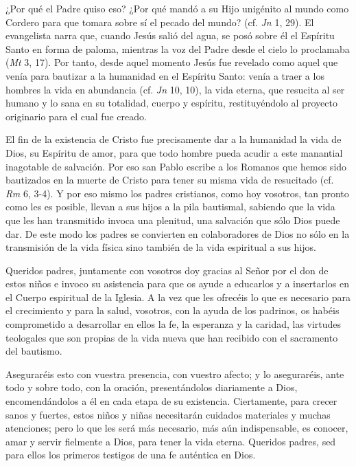 {¿Por qué el Padre quiso eso? ¿Por qué mandó a su Hijo unigénito al mundo como Cordero para que tomara sobre sí el pecado del mundo? (cf. \emph{Jn} 1, 29). El evangelista narra que, cuando Jesús salió del agua, se posó sobre él el Espíritu Santo en forma de paloma, mientras la voz del Padre desde el cielo lo proclamaba  (\emph{Mt} 3, 17). Por tanto, desde aquel momento Jesús fue revelado como aquel que venía para bautizar a la humanidad en el Espíritu Santo: venía a traer a los hombres la vida en abundancia (cf. \emph{Jn} 10, 10), la vida eterna, que resucita al ser humano y lo sana en su totalidad, cuerpo y espíritu, restituyéndolo al proyecto originario para el cual fue creado.

El fin de la existencia de Cristo fue precisamente dar a la humanidad la vida de Dios, su Espíritu de amor, para que todo hombre pueda acudir a este manantial inagotable de salvación. Por eso san Pablo escribe a los Romanos que hemos sido bautizados en la muerte de Cristo para tener su misma vida de resucitado (cf. \emph{Rm} 6, 3-4). Y por eso mismo los padres cristianos, como hoy vosotros, tan pronto como les es posible, llevan a sus hijos a la pila bautismal, sabiendo que la vida que les han transmitido invoca una plenitud, una salvación que sólo Dios puede dar. De este modo los padres se convierten en colaboradores de Dios no sólo en la transmisión de la vida física sino también de la vida espiritual a sus hijos.

Queridos padres, juntamente con vosotros doy gracias al Señor por el don de estos niños e invoco su asistencia para que os ayude a educarlos y a insertarlos en el Cuerpo espiritual de la Iglesia. A la vez que les ofrecéis lo que es necesario para el crecimiento y para la salud, vosotros, con la ayuda de los padrinos, os habéis comprometido a desarrollar en ellos la fe, la esperanza y la caridad, las virtudes teologales que son propias de la vida nueva que han recibido con el sacramento del bautismo.

Aseguraréis esto con vuestra presencia, con vuestro afecto; y lo aseguraréis, ante todo y sobre todo, con la oración, presentándolos diariamente a Dios, encomendándolos a él en cada etapa de su existencia. Ciertamente, para crecer sanos y fuertes, estos niños y niñas necesitarán cuidados materiales y muchas atenciones; pero lo que les será más necesario, más aún indispensable, es conocer, amar y servir fielmente a Dios, para tener la vida eterna. Queridos padres, sed para ellos los primeros testigos de una fe auténtica en Dios.

}
